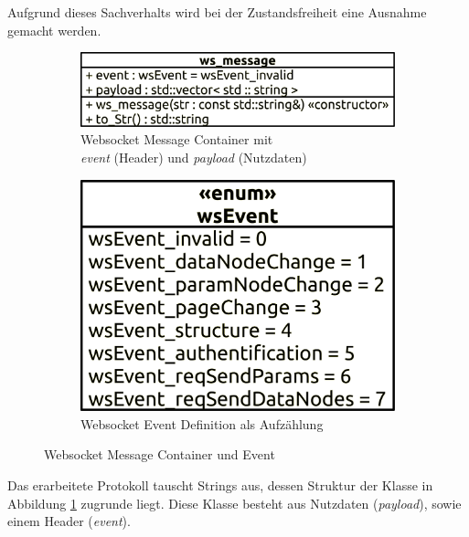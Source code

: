 Aufgrund dieses Sachverhalts wird bei der Zustandsfreiheit eine Ausnahme gemacht werden.\\
\begin{figure}[ht]
  \centering
  \begin{subfigure}[b]{0.601833561\textwidth}
    \includegraphics[width=\textwidth]{content/hauptteil/systemEntwurf/res/protokoll/ws_Message.pdf}
    \caption{Websocket Message Container mit \\ \emph{event} (Header) und \emph{payload} (Nutzdaten)}
    \label{fig:CDWME:ws_message}
  \end{subfigure}
  \hfill
  \begin{subfigure}[b]{0.388166439\textwidth}
    \includegraphics[width=\textwidth]{content/hauptteil/systemEntwurf/res/protokoll/wsEvent.pdf}
    \caption{Websocket Event Definition als Aufzählung}
    \label{fig:CDWME:wsEvent}
  \end{subfigure}
  \caption[Websocket Message Container und Event]{Websocket Message Container und Event}
  \label{fig:CDWME}
\end{figure}
Das erarbeitete Protokoll tauscht Strings aus, dessen Struktur der Klasse in Abbildung \ref{fig:CDWME:ws_message} zugrunde liegt.
Diese Klasse besteht aus Nutzdaten (\emph{payload}), sowie einem Header (\emph{event}).
